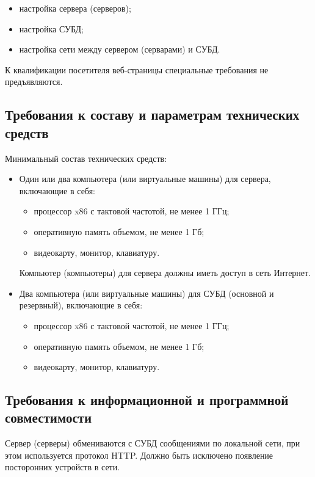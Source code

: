 \documentclass[a4page]{article}
\begin{document}
\begin{itemize}
  \item настройка сервера (серверов);
  \item настройка СУБД;
  \item настройка сети между сервером (серварами) и СУБД.
\end{itemize}

К квалификации посетителя веб-страницы специальные требования не предъявляются.

\subsection{Требования к составу и параметрам технических средств}

Минимальный состав технических средств: 

\begin{itemize}
  \item Один или два компьютера (или виртуальные машины) для сервера, включающие в себя:
    \begin{itemize}
      \item процессор x86 с тактовой частотой, не менее 1 ГГц;
      \item оперативную память объемом, не менее 1 Гб;
      \item видеокарту, монитор, клавиатуру.
    \end{itemize}
    Компьютер (компьютеры) для сервера должны иметь доступ в сеть Интернет.
  \item Два компьютера (или виртуальные машины) для СУБД (основной и резервный), включающие в себя: 
    \begin{itemize}
      \item процессор x86 с тактовой частотой, не менее 1 ГГц;
      \item оперативную память объемом, не менее 1 Гб;
      \item видеокарту, монитор, клавиатуру.
    \end{itemize}
\end{itemize}

\subsection{Требования к информационной и программной совместимости}

Сервер (серверы) обмениваются с СУБД сообщениями по локальной сети, при этом используется протокол HTTP. Должно быть исключено появление посторонних устройств в сети.
\end{document}
